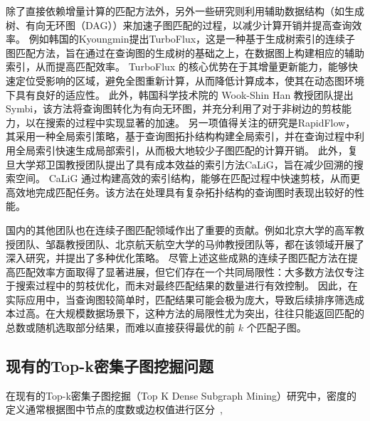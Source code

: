 除了直接依赖增量计算的匹配方法外，另外一些研究则利用辅助数据结构（如生成树、有向无环图（DAG））来加速子图匹配的过程，以减少计算开销并提高查询效率。
例如韩国的Kyoungmin提出TurboFlux\cite{csm-turboflux-DBLP:conf/sigmod/KimSHLHCSJ18}，这是一种基于生成树索引的连续子图匹配方法，旨在通过在查询图的生成树的基础之上，在数据图上构建相应的辅助索引，从而提高匹配效率。
TurboFlux 的核心优势在于其增量更新能力，能够快速定位受影响的区域，避免全图重新计算，从而降低计算成本，使其在动态图环境下具有良好的适应性。
此外，韩国科学技术院的 Wook-Shin Han 教授团队提出Symbi\cite{csm-symbi-DBLP:journals/pvldb/MinPPGIH21}，该方法将查询图转化为有向无环图，并充分利用了对于非树边的剪枝能力，以在搜索的过程中实现显著的加速。
另一项值得关注的研究是RapidFlow\cite{csm-rapidflow-DBLP:journals/pvldb/SunSHL22}，其采用一种全局索引策略，基于查询图拓扑结构构建全局索引，并在查询过程中利用全局索引快速生成局部索引，从而极大地较少子图匹配的计算开销。
此外，复旦大学郑卫国教授团队提出了具有成本效益的索引方法CaLiG\cite{csm-calig-DBLP:journals/pacmmod/YangZZY23}，旨在减少回溯的搜索空间。
CaLiG 通过构建高效的索引结构，能够在匹配过程中快速剪枝，从而更高效地完成匹配任务。该方法在处理具有复杂拓扑结构的查询图时表现出较好的性能。

国内的其他团队也在连续子图匹配领域作出了重要的贡献。例如北京大学的高军教授团队、邹磊教授团队、北京航天航空大学的马帅教授团队等，都在该领域开展了深入研究，并提出了多种优化策略。
尽管上述这些成熟的连续子图匹配方法在提高匹配效率方面取得了显著进展，但它们存在一个共同局限性：大多数方法仅专注于搜索过程中的剪枝优化，而未对最终匹配结果的数量进行有效控制。
因此，在实际应用中，当查询图较简单时，匹配结果可能会极为庞大，导致后续排序筛选成本过高。在大规模数据场景下，这种方法的局限性尤为突出，往往只能返回匹配的总数或随机选取部分结果，而难以直接获得最优的前 $k$ 个匹配子图。
\subsection{现有的Top-k密集子图挖掘问题}
在现有的Top-k密集子图挖掘（Top K Dense Subgraph Mining）研究中，密度的定义通常根据图中节点的度数或边权值进行区分~\cite{dsm-noweight-Bahmani-DBLP:journals/pvldb/BahmaniKV12,dsm-noweight-Balalau-DBLP:conf/wsdm/BalalauBCGS15,dsm-noweight-Bonchi-DBLP:journals/corr/abs-2007-01533,dsm-noweight-Dondi-DBLP:journals/corr/abs-2002-07695,dsm-noweight-Fang-DBLP:journals/pvldb/FangYCLL19,dsm-noweight-Gabert-DBLP:conf/wsdm/GabertPC21,dsm-noweight-Hu-DBLP:conf/cikm/HuWC17,dsm-noweight-Ma-DBLP:journals/pvldb/MaCLH22,dsm-noweight-Mathieu-DBLP:journals/corr/abs-2010-07794,dsm-noweight-McGregor-DBLP:journals/corr/McGregorTVV15,dsm-noweight-Rozenshtein-DBLP:journals/tkdd/RozenshteinTG17,dsm-noweight-Saha-DBLP:journals/corr/abs-2212-08820,dsm-noweight-Tsourakakis-DBLP:conf/kdd/TsourakakisBGGT13,dsm-noweight-Valari-DBLP:conf/ssdbm/ValariKP12,dsm-noweight-Zhao-DBLP:conf/icalip/ZhaoQYB14,dsm-weight-Angel-DBLP:journals/vldb/AngelKSSST14,dsm-weight-Ma-DBLP:conf/icde/MaHWLH17,dsm-weight-Muhammad-DBLP:conf/cikm/NasirGMG17},

